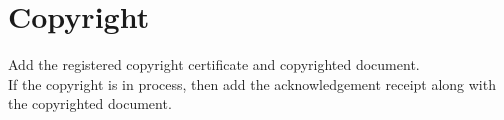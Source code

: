 \chapter{Copyright}

Add the registered copyright certificate and copyrighted document. \\
If the copyright is in process, then add the acknowledgement receipt along with the copyrighted document.